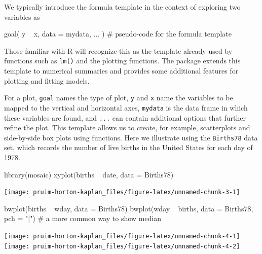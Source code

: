 We typically introduce the formula template in the context of exploring
two variables as

\begin{Schunk}
\begin{Sinput}
goal( y ~ x, data = mydata, ... )    # pseudo-code for the formula template
\end{Sinput}
\end{Schunk}

\noindent
Those familiar with R will recognize this as the template already used
by functions such as \texttt{lm()} and the  plotting
functions. The  package extends this template to numerical
summaries and provides some additional features for plotting and fitting
models.

For a plot, \texttt{goal} names the type of plot, \texttt{y} and
\texttt{x} name the variables to be mapped to the vertical and
horizontal axes, \texttt{mydata} is the data frame in which these
variables are found, and \texttt{...} can contain additional options
that further refine the plot. This template allows us to create, for
example, scatterplots and side-by-side box plots using 
functions. Here we illustrate using the \texttt{Births78} data set,
which records the number of live births in the United States for each
day of 1978.

\begin{Schunk}
\begin{Sinput}
library(mosaic) 
xyplot(births ~ date, data = Births78)
\end{Sinput}


\begin{center}\texttt{[image: pruim-horton-kaplan\_files/figure-latex/unnamed-chunk-3-1]} \end{center}

\end{Schunk}\begin{Schunk}
\begin{Sinput}
bwplot(births ~ wday, data = Births78) 
bwplot(wday ~ births, data = Births78, pch = "|")  # a more common way to show median
\end{Sinput}


\begin{center}\texttt{[image: pruim-horton-kaplan\_files/figure-latex/unnamed-chunk-4-1]} \texttt{[image: pruim-horton-kaplan\_files/figure-latex/unnamed-chunk-4-2]} \end{center}

\end{Schunk}

